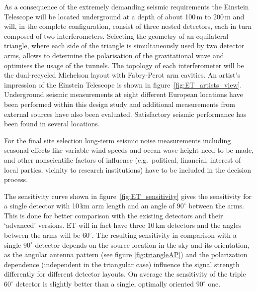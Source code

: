 As a consequence of the extremely demanding seismic requirements the Einstein Telescope will be located underground at a depth of about 100\,m to 200\,m and will, in the complete configuration, consist of three nested detectors, each in turn composed of two interferometers. Selecting the geometry of an equilateral triangle,  where each side of the triangle is simultaneously used by two detector arms, allows to determine the polarisation of the gravitational wave and optimises the usage of the tunnels. The topology of each interferometer will be the dual-recycled Michelson layout with Fabry-Perot arm cavities. An artist's impression of the Einstein Telescope is shown in figure~\ref{fig:ET_artists_view}. \\
Underground seismic measurements at eight different European locations have been performed within this design study and additional measurements from external sources have also been evaluated. Satisfactory seismic performance has been found in several locations. 

For the final site selection long-term seismic noise measurements including seasonal effects like variable wind speeds and ocean wave height need to be made, and other nonscientific factors of influence (e.g.\ political, financial, interest of local parties, vicinity to research institutions) have to be included in the decision process.

The sensitivity curve shown in figure~\ref{fig:ET_sensitivity} gives the sensitivity for a single detector with 10\,km arm length and an angle of $90^{\circ}$ between the arms. This is done for better comparison with the existing detectors and their `advanced' versions. ET will in fact have three 10\,km detectors and the angles between the arms will be $60^{\circ}$. The resulting sensitivity in comparison with a single $90^{\circ}$ detector depends on the source location in the sky and its orientation, as the angular antenna pattern (see figure \ref{fig:triangleAP}) and the polarization dependence (independent in the triangular case) influence the signal strength differently for different detector layouts. On average the sensitivity of the triple $60^{\circ}$ detector is slightly better than a single, optimally oriented $90^{\circ}$ one.

